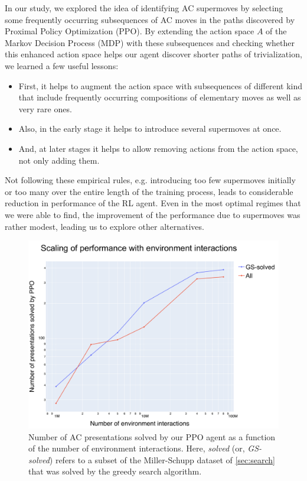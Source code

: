 In our study, we explored the idea of identifying AC supermoves by selecting some frequently occurring subsequences of AC moves in the paths discovered by Proximal Policy Optimization (PPO). By extending the action space $A$ of the Markov Decision Process (MDP) with these subsequences and checking whether this enhanced action space helps our agent discover shorter paths of trivialization, we learned a few useful lessons:

\begin{itemize}

\item First, it helps to augment the action space with subsequences of different kind that include frequently occurring compositions of elementary moves as well as very rare ones.

\item  Also, in the early stage it helps to introduce several supermoves at once.

\item And, at later stages it helps to allow removing actions from the action space, not only adding them.
    
\end{itemize}

\noindent
Not following these empirical rules, e.g. introducing too few supermoves initially or too many over the entire length of the training process, leads to considerable reduction in performance of the RL agent. Even in the most optimal regimes that we were able to find, the improvement of the performance due to supermoves was rather modest, leading us to explore other alternatives.

\begin{figure}
	\centering
	\includegraphics[scale=0.35]{fig/scaling_env.pdf}
	\caption{Number of AC presentations solved by our PPO agent as a function of the number of environment interactions. Here, \textit{solved} (or, \textit{GS-solved}) refers to a subset of the Miller-Schupp dataset of \autoref{sec:search} that was solved by the greedy search algorithm.}
	\label{fig:scaling_env}
\end{figure}

